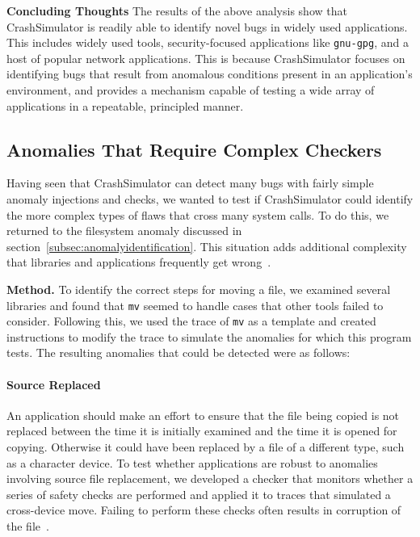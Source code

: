 {\bf Concluding Thoughts} The results of the above analysis show that
CrashSimulator is readily able to identify novel bugs in widely used
applications.  This includes widely used tools, security-focused
applications like {\tt gnu-gpg}, and a host of popular network
applications.  This is because CrashSimulator focuses on identifying bugs
that result from anomalous conditions present in an application's
environment, and provides a mechanism capable of testing a wide array of
applications in a repeatable, principled manner.

\subsection{Anomalies That Require Complex Checkers}
\label{sec-complex}

Having seen that CrashSimulator can detect many bugs with fairly simple
anomaly injections and checks, we wanted to test if CrashSimulator could
identify the more complex types of flaws that cross many system calls.  To
do this, we returned to the filesystem anomaly discussed in
section~\ref{subsec:anomalyidentification}.  This situation adds additional
complexity that libraries and applications frequently get
wrong~\cite{PHPRenameBug,PythonShutilBug,NodejsCopyBug}.

{\bf Method.}  To identify the correct steps for moving a file,
we examined several libraries and found that {\tt mv} seemed
to handle cases that other tools failed to consider.  Following this, we
used the trace of {\tt mv} as a template and created instructions to modify
the trace to simulate the anomalies for which this program tests.
The resulting anomalies that could be detected were as follows:

\paragraph{Source Replaced}

An application should make an effort to ensure that the file being copied
is not replaced between the time it is initially examined and the time it
is opened for copying.  Otherwise it could have been replaced by a file of
a different type, such as a character device.  To test whether applications
are robust to anomalies involving source file replacement, we developed a
checker that monitors whether a series of safety checks are performed and
applied it to traces that simulated a cross-device move.  Failing to
perform these checks often results in corruption of the
file~\cite{PythonShutilBug}.

